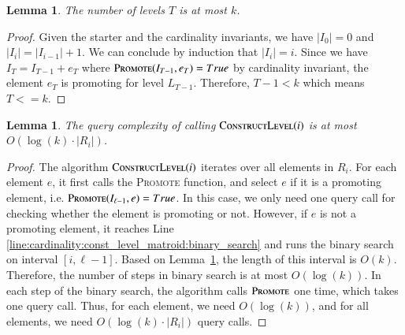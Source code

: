 \documentclass[11pt]{article}
\newtheorem{lemma}[theorem]{Lemma}
\newcommand{\mO}{O}
\newcommand{\constLevel}{\textsc{ConstructLevel}}
\newcommand{\suit}{\textsc{Promote}}
\newcommand{\replacementTester}{\textsc{Promote}}
\begin{document}
\begin{lemma}
\label{lm:cardinality:number_of_levels}
  The number of levels $T$ is at most $k$.
\end{lemma}
\begin{proof}
  Given the starter and the cardinality invariants, we have $|I_0|=0$ and $|I_i|=|I_{i-1}|+1$.
  We can conclude by induction that $|I_{i}| = i$. 
  Since we have $I_T=I_{T-1}+e_T$ where $\suit{}(I_{T-1},e_T)=True$ by cardinality invariant, the element $e_T$ is promoting for level $L_{T-1}$. Therefore, $T-1<k$ which means $T<=k$.
\end{proof}


\begin{lemma}
\label{lm:cardinality:level_query_complexity}
  The query complexity of calling $\constLevel{}(i)$ is at most
  $\mO\left(\log\left(k\right)\cdot|R_i|\right)$.
\end{lemma}
\begin{proof}
  The algorithm $\constLevel{}(i)$ iterates over all elements in $R_i$.
  For each element $e$, it first calls the \replacementTester{} function, and select $e$ if it is a promoting element, i.e. $\replacementTester(I_{\ell-1}, e) = True$. In this case, we only need one query call for checking whether the element is promoting or not.
  However, if $e$ is not a promoting element, it reaches Line \ref{line:cardinality:const_level_matroid:binary_search} and runs the binary search on interval $[i,\ell-1]$.
  Based on Lemma~\ref{lm:cardinality:number_of_levels}, the length of this interval is  $\mO\left(k\right)$.
  Therefore, the number of steps in binary search is at most $\mO\left(\log\left(k\right)\right)$.
  In each step of the binary search, the algorithm calls $\replacementTester$ one time, which takes one query call.
  Thus, for each element, we need $\mO\left(\log\left(k\right)\right)$, and for all elements, we need $\mO\left(\log\left(k\right)\cdot|R_i|\right)$ query calls.
\end{proof}
\end{document}
